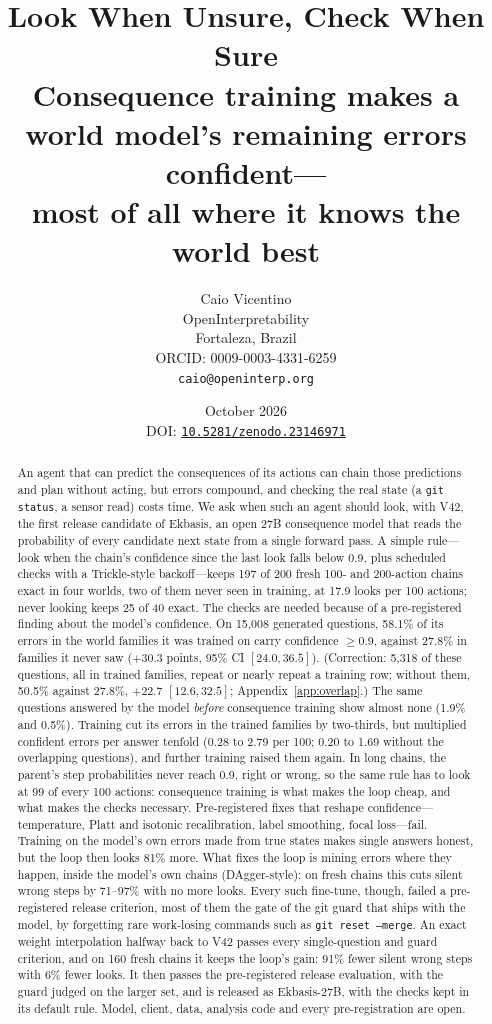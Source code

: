 \documentclass[11pt]{article}
\title{Look When Unsure, Check When Sure\\[4pt]
\large Consequence training makes a world model's remaining errors confident---\\
most of all where it knows the world best}
\author{%
  Caio Vicentino \\ OpenInterpretability \\ Fortaleza, Brazil \\
  ORCID: 0009-0003-4331-6259 \\ \texttt{caio@openinterp.org}}
\date{October 2026\\[2pt]
  {\small DOI: \href{https://doi.org/10.5281/zenodo.23146971}{\texttt{10.5281/zenodo.23146971}}}}
\begin{document}
\maketitle

\begin{abstract}
An agent that can predict the consequences of its actions can chain those predictions and plan without acting, but
errors compound, and checking the real state (a \texttt{git status}, a sensor read) costs time. We ask when such an
agent should look, with V42, the first release candidate of Ekbasis, an open 27B consequence model that reads the
probability of every candidate next state from a single forward pass. A simple rule---look when the chain's confidence since the last look falls below 0.9,
plus scheduled checks with a Trickle-style backoff---keeps 197 of 200 fresh 100- and 200-action chains exact in four
worlds, two of them never seen in training, at 17.9 looks per 100 actions; never looking keeps 25 of 40 exact. The
checks are needed because of a pre-registered finding about the model's confidence. On 15,008 generated questions, 58.1\% of
its errors in the world families it was trained on carry confidence $\ge 0.9$, against 27.8\% in families it never saw
($+30.3$ points, 95\% CI $[24.0, 36.5]$). (Correction: 5,318 of these questions, all in trained families, repeat or
nearly repeat a training row; without them, 50.5\% against 27.8\%, $+22.7$ $[12.6, 32.5]$; Appendix~\ref{app:overlap}.)
The same questions answered by the model \emph{before} consequence training
show almost none (1.9\% and 0.5\%). Training cut its errors in the trained families by two-thirds, but multiplied
confident errors per answer tenfold (0.28 to 2.79 per 100; 0.20 to 1.69 without the overlapping questions), and
further training raised them again.
In long chains, the parent's step probabilities never reach 0.9, right or wrong, so the same rule has to look at 99
of every 100 actions: consequence training is what makes the loop cheap, and what makes the checks necessary.
Pre-registered fixes that reshape confidence---temperature, Platt
and isotonic recalibration, label smoothing, focal loss---fail. Training on the model's own errors made from true
states makes single answers honest, but the loop then looks 81\% more. What fixes the loop is mining errors where they
happen, inside the model's own chains (DAgger-style): on fresh chains this cuts silent wrong steps by 71--97\% with no
more looks. Every such fine-tune, though, failed a pre-registered release criterion, most of them the gate of the git
guard that ships with the model, by forgetting rare work-losing commands such as \texttt{git reset --merge}. An exact
weight interpolation halfway back to V42 passes every single-question and guard criterion, and on 160
fresh chains it keeps the loop's gain: 91\% fewer silent wrong steps with 6\% fewer looks. It then passes the
pre-registered release evaluation, with the guard judged on the larger set, and is released as Ekbasis-27B, with the
checks kept in its default rule. Model, client, data, analysis
code and every pre-registration are open.
\end{abstract}
\end{document}
